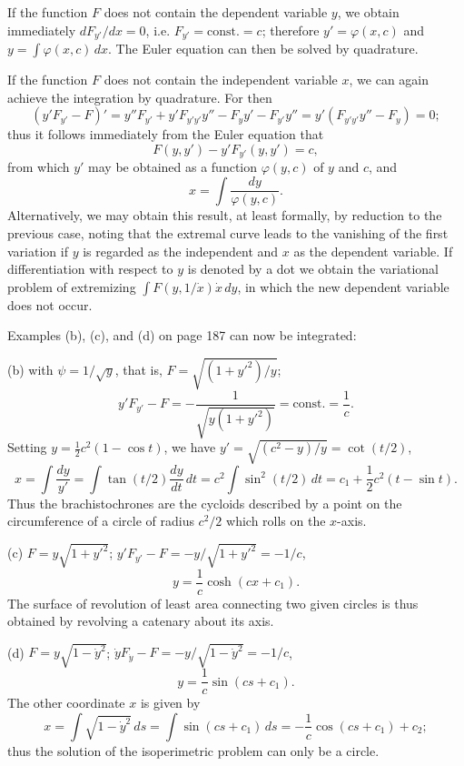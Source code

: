 If the function $F$ does not contain the dependent variable $y$, we obtain immediately $dF_{y'}/dx=0$, i.e. $F_{y'}=\mathrm{const.}=c$; therefore $y'=\varphi(x,c)$ and $y=\int\varphi(x,c)\,dx$. The Euler equation can then be solved by quadrature.

If the function $F$ does not contain the independent variable $x$, we can again achieve the integration by quadrature. For then
\[
(y'F_{y'}-F)'=y''F_{y'}+y'F_{y'y'}y''-F_yy'-F_{y'}y''
=y'(F_{y'y'}y''-F_y)=0;
\]
thus it follows immediately from the Euler equation that
\[
F(y,y')-y'F_{y'}(y,y')=c,
\]
from which $y'$ may be obtained as a function $\varphi(y,c)$ of $y$ and $c$, and
\[
x=\int\frac{dy}{\varphi(y,c)}.
\]
Alternatively, we may obtain this result, at least formally, by reduction to the previous case, noting that the extremal curve leads to the vanishing of the first variation if $y$ is regarded as the independent and $x$ as the dependent variable. If differentiation with respect to $y$ is denoted by a dot we obtain the variational problem of extremizing $\int F(y,1/\dot x)\dot x\,dy$, in which the new dependent variable does not occur.

Examples (b), (c), and (d) on page 187 can now be integrated:

(b) with $\psi=1/\sqrt y$, that is, $F=\sqrt{(1+y'^2)/y}$;
\[
y'F_{y'}-F=-\frac{1}{\sqrt{y(1+y'^2)}}=\mathrm{const.}=\frac1c.
\]
Setting $y=\tfrac12c^2(1-\cos t)$, we have $y'=\sqrt{(c^2-y)/y}=\cot(t/2)$,
\[
x=\int\frac{dy}{y'}=\int\tan(t/2)\frac{dy}{dt}\,dt
=c^2\int\sin^2(t/2)\,dt
=c_1+\frac12c^2(t-\sin t).
\]
Thus the brachistochrones are the cycloids described by a point on the circumference of a circle of radius $c^2/2$ which rolls on the $x$-axis.

(c) $F=y\sqrt{1+y'^2}$; $y'F_{y'}-F=-y/\sqrt{1+y'^2}=-1/c$,
\[
y=\frac1c\cosh(cx+c_1).
\]
The surface of revolution of least area connecting two given circles is thus obtained by revolving a catenary about its axis.

(d) $F=y\sqrt{1-\dot y^2}$; $\dot yF_{\dot y}-F=-y/\sqrt{1-\dot y^2}=-1/c$,
\[
y=\frac1c\sin(cs+c_1).
\]
The other coordinate $x$ is given by
\[
x=\int\sqrt{1-\dot y^2}\,ds
=\int\sin(cs+c_1)\,ds
=-\frac1c\cos(cs+c_1)+c_2;
\]
thus the solution of the isoperimetric problem can only be a circle.

